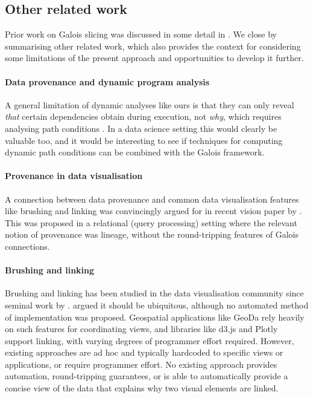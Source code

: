 \subsection{Other related work}
\label{sec:conclusion:other-related-work}

Prior work on Galois slicing \cite{perera12a,ricciotti17,perera16d} was discussed in some detail in . We close by summarising other related work, which also provides the context for considering some limitations of the present approach and opportunities to develop it further.

\paragraph{Data provenance and dynamic program analysis}

A general limitation of dynamic analyses like ours is that they can only reveal \emph{that} certain dependencies obtain during execution, not \emph{why}, which requires analysing path conditions \cite{hammer06}. In a data science setting this would clearly be valuable too, and it would be interesting to see if techniques for computing dynamic path conditions can be combined with the Galois framework.

\paragraph{Provenance in data visualisation}

A connection between data provenance and common data visualisation features like brushing and linking was convincingly argued for in recent vision paper by \citet{psallidas18}. This was proposed in a relational (query processing) setting where the relevant notion of provenance was lineage, without the round-tripping features of Galois connections.

\paragraph{Brushing and linking}

Brushing and linking has been studied in the data visualisation community since seminal work by \citet{becker87}. \citet{roberts06} argued it should be ubiquitous, although no automated method of implementation was proposed. Geospatial applications like GeoDa \cite{anselin06} rely heavily on such features for coordinating views, and libraries like d3.js and Plotly support linking, with varying degrees of programmer effort required. However, existing approaches are ad hoc and typically hardcoded to specific views or applications, or require programmer effort. No existing approach provides automation, round-tripping guarantees, or is able to automatically provide a concise view of the data that explains why two visual elements are linked.

